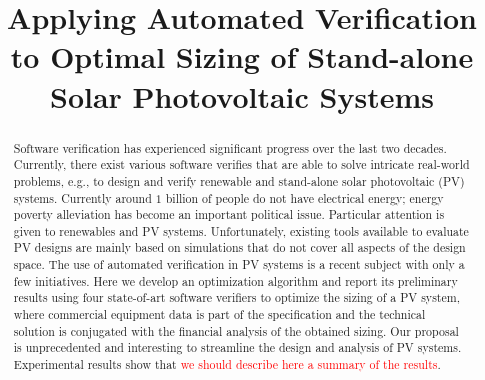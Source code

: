 \documentclass[10pt,conference]{IEEEtran}
\begin{document}
\title{Applying Automated Verification to Optimal Sizing of Stand-alone Solar Photovoltaic Systems\\
}

\author{
\and
{}
}

\maketitle

\begin{abstract}
Software verification has experienced significant progress over the last two decades. Currently, there exist various software verifies that are able to solve intricate real-world problems, e.g., to design and verify renewable and stand-alone solar photovoltaic (PV) systems. 
Currently around $1$ billion of people do not have electrical energy; energy poverty alleviation has become an important political issue. 
Particular attention is given to renewables and PV systems. Unfortunately, existing tools available to evaluate PV designs are mainly based on simulations that do not cover all aspects of the design space. 
The use of automated verification in PV systems is a recent subject with only a few initiatives. 
Here we develop an optimization algorithm and report its preliminary results using four state-of-art software verifiers to optimize the sizing of a PV system, where commercial equipment data is part of the specification and the technical solution is conjugated with the financial analysis of the obtained sizing. 
Our proposal is unprecedented and interesting to streamline the design and analysis of PV systems. Experimental results show that \textcolor{red}{we should describe here a summary of the results}.
\end{abstract}
\end{document}
